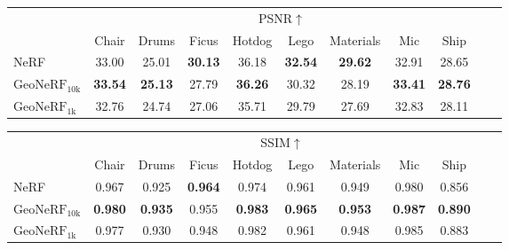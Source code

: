 \begin{table}[!t]
    \begin{center}
        \begin{threeparttable}
            \begin{tabular}{l|cccccccccc}
            & \multicolumn{8}{c}{PSNR$\uparrow$} \\
            &  Chair & Drums & Ficus & Hotdog & Lego & Materials & Mic & Ship \\
            \hline
            NeRF & 33.00 & 25.01 & \textbf{30.13} & 36.18 & \textbf{32.54} & \textbf{29.62} & 32.91 & 28.65 \\
            $\text{GeoNeRF}_{\text{10k}}$ & \textbf{33.54} & \textbf{25.13} & 27.79 & \textbf{36.26} & 30.32 & 28.19 & \textbf{33.41} & \textbf{28.76} \\
            $\text{GeoNeRF}_{\text{1k}}$ & 32.76 & 24.74 & 27.06 & 35.71 & 29.79 & 27.69 & 32.83 & 28.11 \\            
            \hline
            \end{tabular}
        \end{threeparttable}
    \end{center}
    
    \vspace{1.0ex}

    \begin{center}
        \begin{threeparttable}
            \begin{tabular}{l|cccccccccc}
            & \multicolumn{8}{c}{SSIM$\uparrow$} \\
            &  Chair & Drums & Ficus & Hotdog & Lego & Materials & Mic & Ship \\
            \hline
            NeRF & 0.967 & 0.925 & \textbf{0.964} & 0.974 & 0.961 & 0.949 & 0.980 & 0.856 \\
            $\text{GeoNeRF}_{\text{10k}}$ & \textbf{0.980} & \textbf{0.935} & 0.955 & \textbf{0.983} & \textbf{0.965} & \textbf{0.953} & \textbf{0.987} & \textbf{0.890} \\
            $\text{GeoNeRF}_{\text{1k}}$ & 0.977 & 0.930 & 0.948 & 0.982 & 0.961 & 0.948 & 0.985 & 0.883 \\            
            \hline
            \end{tabular}
        \end{threeparttable}
    \end{center}
    
    \vspace{1.0ex}


\end{table}
